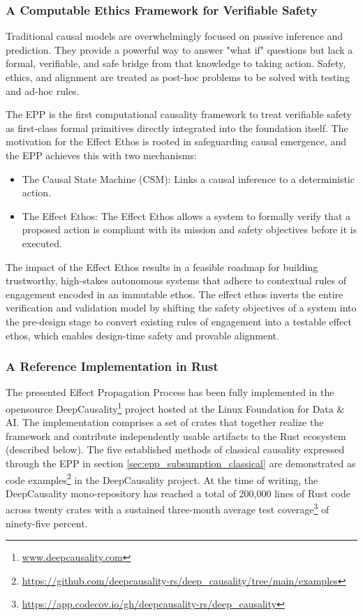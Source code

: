 \subsubsection{A Computable Ethics Framework for Verifiable Safety}

Traditional causal models are overwhelmingly focused on passive inference and prediction. They provide a powerful way to answer "what if" questions but lack a formal, verifiable, and safe bridge from that knowledge to taking action. Safety, ethics, and alignment are treated as post-hoc problems to be solved with testing and ad-hoc rules.

The EPP is the first computational causality framework to treat verifiable safety as first-class formal primitives directly integrated into the foundation itself. The motivation for the Effect Ethos is rooted in safeguarding causal emergence, and the EPP achieves this with two mechanisms:

\begin{itemize}
\item The Causal State Machine (CSM):  Links a causal inference to a deterministic action.
\item The Effect Ethos: The Effect Ethos allows a system to formally verify that a proposed action is compliant with its mission and safety objectives before it is executed.
\end{itemize}

The impact of the Effect Ethos results in a feasible roadmap for building trustworthy, high-stakes autonomous systems that adhere to contextual rules of engagement encoded in an immutable ethos. The effect ethos inverts the entire verification and validation model by shifting the safety objectives of a system into the pre-design stage to convert existing rules of engagement into a testable effect ethos, which enables design-time safety and provable alignment.

\subsubsection{A Reference Implementation in Rust}

The presented Effect Propagation Process has been fully implemented in the open\-source DeepCausality\footnote{\url{www.deepcausality.com}} project hosted at the Linux Foundation for Data \& AI. The implementation comprises a set of crates that together realize the framework and contribute independently usable artifacts to the Rust ecosystem (described below). The five established methods of classical causality expressed through the EPP in section \ref{sec:epp_subsumption_classical} are demonstrated as code examples\footnote{\url{https://github.com/deepcausality-rs/deep_causality/tree/main/examples}} in the DeepCausality project. At the time of writing, the DeepCausality mono-repository has reached a total of 200,000 lines of Rust code across twenty crates with a sustained three-month average test coverage\footnote{\url{https://app.codecov.io/gh/deepcausality-rs/deep_causality}} of ninety-five percent.


